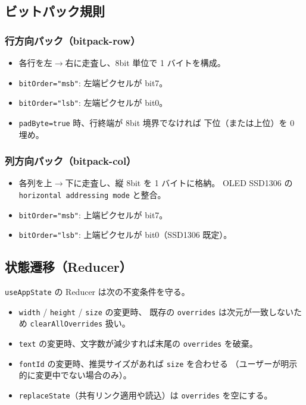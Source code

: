 \subsection{ビットパック規則}

\subsubsection{行方向パック（bitpack-row）}

\begin{itemize}[leftmargin=*,itemsep=1pt]
  \item 各行を左$\to$右に走査し、8bit 単位で 1 バイトを構成。
  \item \texttt{bitOrder="msb"}: 左端ピクセルが bit7。
  \item \texttt{bitOrder="lsb"}: 左端ピクセルが bit0。
  \item \texttt{padByte=true} 時、行終端が 8bit 境界でなければ
        下位（または上位）を 0 埋め。
\end{itemize}

\subsubsection{列方向パック（bitpack-col）}

\begin{itemize}[leftmargin=*,itemsep=1pt]
  \item 各列を上$\to$下に走査し、縦 8bit を 1 バイトに格納。
        OLED SSD1306 の \texttt{horizontal addressing mode} と整合。
  \item \texttt{bitOrder="msb"}: 上端ピクセルが bit7。
  \item \texttt{bitOrder="lsb"}: 上端ピクセルが bit0（SSD1306 既定）。
\end{itemize}

\subsection{状態遷移（Reducer）}

\texttt{useAppState} の Reducer は次の不変条件を守る。

\begin{itemize}[leftmargin=*,itemsep=2pt]
  \item \texttt{width} / \texttt{height} / \texttt{size} の変更時、
        既存の \texttt{overrides} は次元が一致しないため \texttt{clearAllOverrides} 扱い。
  \item \texttt{text} の変更時、文字数が減少すれば末尾の \texttt{overrides} を破棄。
  \item \texttt{fontId} の変更時、推奨サイズがあれば \texttt{size} を合わせる
        （ユーザーが明示的に変更中でない場合のみ）。
  \item \texttt{replaceState}（共有リンク適用や読込）は \texttt{overrides} を空にする。
\end{itemize}

